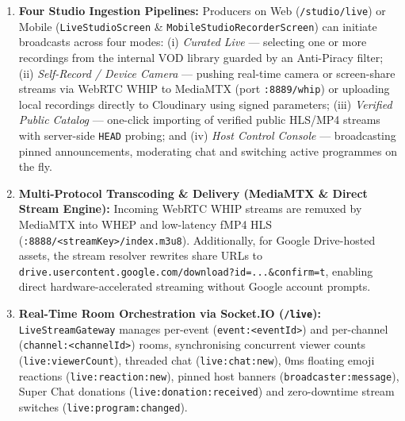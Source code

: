 {\begin{enumerate}[leftmargin=*,itemsep=2pt]
  \item \textbf{Four Studio Ingestion Pipelines:} Producers on Web (\texttt{/studio/live}) or Mobile (\texttt{LiveStudioScreen} \& \texttt{MobileStudioRecorderScreen}) can initiate broadcasts across four modes: (i) \emph{Curated Live} — selecting one or more recordings from the internal VOD library guarded by an Anti-Piracy filter; (ii) \emph{Self-Record / Device Camera} — pushing real-time camera or screen-share streams via WebRTC WHIP to MediaMTX (port \texttt{:8889/whip}) or uploading local recordings directly to Cloudinary using signed parameters; (iii) \emph{Verified Public Catalog} — one-click importing of verified public HLS/MP4 streams with server-side \texttt{HEAD} probing; and (iv) \emph{Host Control Console} — broadcasting pinned announcements, moderating chat and switching active programmes on the fly.
  \item \textbf{Multi-Protocol Transcoding \& Delivery (MediaMTX \& Direct Stream Engine):} Incoming WebRTC WHIP streams are remuxed by MediaMTX into WHEP and low-latency fMP4 HLS (\texttt{:8888/<streamKey>/index.m3u8}). Additionally, for Google Drive-hosted assets, the stream resolver rewrites share URLs to \texttt{drive.usercontent.google.com/download?id=...\&confirm=t}, enabling direct hardware-accelerated streaming without Google account prompts.
  \item \textbf{Real-Time Room Orchestration via Socket.IO (\texttt{/live}):} \texttt{LiveStreamGateway} manages per-event (\texttt{event:<eventId>}) and per-channel (\texttt{channel:<channelId>}) rooms, synchronising concurrent viewer counts (\texttt{live:viewerCount}), threaded chat (\texttt{live:chat:new}), 0ms floating emoji reactions (\texttt{live:reaction:new}), pinned host banners (\texttt{broadcaster:message}), Super Chat donations (\texttt{live:donation:received}) and zero-downtime stream switches (\texttt{live:program:changed}).
\end{enumerate}
}

\subsection{}


